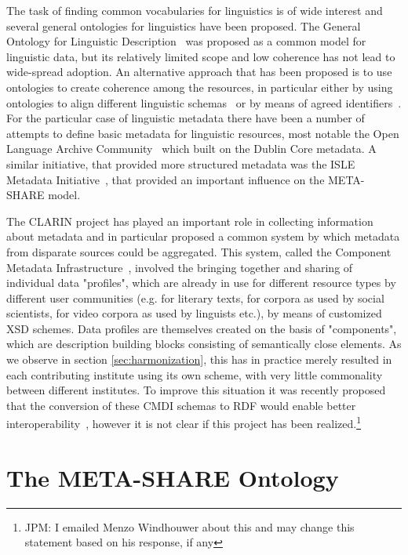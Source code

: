\documentclass{llncs}
\begin{document}
The task of finding common vocabularies for linguistics is of wide interest and
several general ontologies for linguistics have been proposed. The General
Ontology for Linguistic Description~\cite[GOLD]{farrar2002common} was proposed
as a common model for linguistic data, but its relatively limited scope and low
coherence has not lead to wide-spread adoption. An alternative approach that has
been proposed is to use ontologies to create coherence among the resources, in
particular either by using ontologies to align different linguistic
schemas~\cite{chiarcos2012ontologies} or by means of agreed
identifiers~\cite{kemps2008isocat}. For the particular case of linguistic
metadata there have been a number of attempts to define basic metadata for
linguistic resources, most notable the Open Language Archive
Community~\cite[OLAC]{bird2001olac} which built on the Dublin Core metadata. A
similar initiative, that provided more structured metadata was the ISLE Metadata
Initiative~\cite[IMDI]{broeder2001imdi}, that provided an important influence on
the META-SHARE model.

The CLARIN project has played an important role in collecting information about
metadata and in particular proposed a common system by which metadata from
disparate sources could be aggregated. This system, called the Component
Metadata Infrastructure~\cite{broeder2012cmdi}, involved the bringing together and sharing of
individual data "profiles", which are already in use for different resource types by different user communities (e.g. for literary texts, for corpora as used by social scientists, for video corpora as used by linguists etc.), by means of customized XSD schemes. Data profiles are themselves created on the basis of "components", which are description building blocks consisting of semantically close elements. 
As we observe in section \ref{sec:harmonization}, this has in practice merely
resulted in each contributing institute using its own scheme, with very little
commonality between different institutes. To improve this situation it was
recently proposed that the conversion of these CMDI schemas to RDF would enable
better interoperability~\cite{durco2014clarin}, however it is not clear if this
project has been realized.\footnote{JPM: I emailed Menzo Windhouwer about this
and may change this statement based on his response, if any}

\section{The META-SHARE Ontology}
\label{sec:ontology}
\end{document}

